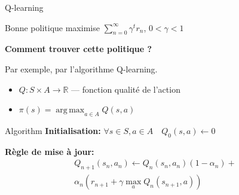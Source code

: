 \documentclass{beamer}
\newcommand{\R}{\mathbb{R}}
\DeclareMathOperator*{\argmax}{arg\,max}
\begin{document}
\begin{frame}[t]{Q-learning}

  Bonne politique maximise  $\sum_{n = 0}^\infty \gamma^t r_n$, $0 < \gamma < 1$
  \vspace{2em}

  {\bf Comment trouver cette politique ?} 

  Par exemple, par l'algorithme Q-learning.
  
  \begin{definition}
    \begin{itemize}
    \item  $Q : S \times A \to \R$ --- fonction qualité de l'action 
    \item  $\pi (s) = \argmax_{a \in A} Q(s, a)$
    \end{itemize}
  \end{definition}
  
  \vspace{-1em}
  \begin{block}{Algorithm}
    {\bf Initialisation:} $\forall s \in S, a \in A  \quad Q_0 (s,a) \leftarrow 0$
    \vspace{1em}

    {\bf Règle de mise à jour:}
    \vspace{-1em}\begin{multline*}
      Q_{n+1}(s_n,a_n) \leftarrow Q_n(s_n,a_n) (1 - \alpha_n) + \\
      \alpha_n \left( r_{n+1} + \gamma \max_a Q_n(s_{n+1},a)     \right)
    \end{multline*}
  \end{block}

\end{frame}
\end{document}
